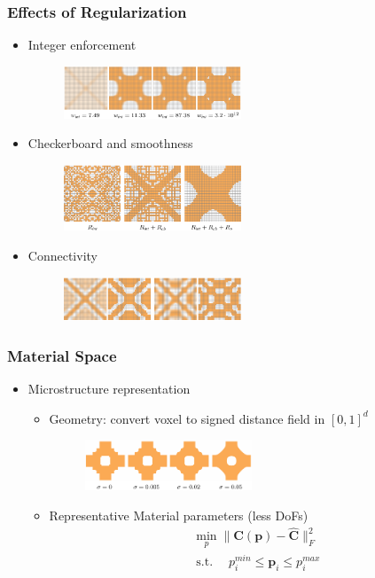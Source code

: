 \documentclass[serif,mathserif]{beamer}
\newcommand{\BOLD}[1]{\mathbf{#1}}
\DeclareMathOperator{\ST}{s.t.}
\begin{document}
\begin{frame}
  \frametitle{Effects of Regularization}
  \begin{itemize}
  \item Integer enforcement
    \begin{figure}
      \includegraphics[width=0.5\textwidth]{img/Rint}
    \end{figure}
    \pause
  \item Checkerboard and smoothness
    \begin{figure}
      \includegraphics[width=0.5\textwidth]{img/allR}
    \end{figure}
    \pause
  \item Connectivity
    \begin{figure}
      \includegraphics[width=0.5\textwidth]{img/connectivity}
    \end{figure}
  \end{itemize}
\end{frame}

\begin{frame}
  \frametitle{Material Space}
  \begin{itemize}
  \item Microstructure representation
    \begin{itemize}
    \item Geometry: convert voxel to signed distance field in $[0, 1]^d$
      \begin{figure}
        \includegraphics[width=0.5\textwidth]{img/gaussian}
      \end{figure}
      \pause
    \item Representative Material parameters (less DoFs)
      \begin{equation*}
        \begin{split}
        &\min_p \|\BOLD{C}(\BOLD{p})-\hat{\BOLD{C}}\|_F^2 \\
        &\ST\quad p_i^{min} \le \BOLD{p}_i \le p_i^{max}
        \end{split}
      \end{equation*}
    \end{itemize}
  \end{itemize}
\end{frame}
\end{document}
